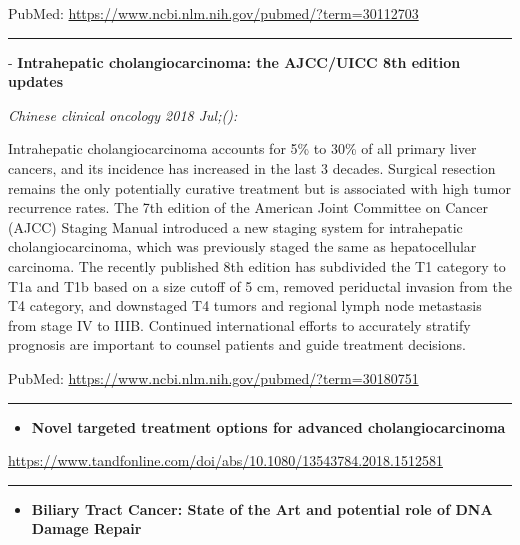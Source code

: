 \documentclass[]{article}
\providecommand{\tightlist}{%
  \setlength{\itemsep}{0pt}\setlength{\parskip}{0pt}}
\begin{document}
PubMed: \url{https://www.ncbi.nlm.nih.gov/pubmed/?term=30112703}

{}

{}

\begin{center}\rule{0.5\linewidth}{\linethickness}\end{center}

 - \textbf{Intrahepatic cholangiocarcinoma: the AJCC/UICC 8th edition
updates}

\emph{Chinese clinical oncology 2018 Jul;():}

Intrahepatic cholangiocarcinoma accounts for 5\% to 30\% of all primary
liver cancers, and its incidence has increased in the last 3 decades.
Surgical resection remains the only potentially curative treatment but
is associated with high tumor recurrence rates. The 7th edition of the
American Joint Committee on Cancer (AJCC) Staging Manual introduced a
new staging system for intrahepatic cholangiocarcinoma, which was
previously staged the same as hepatocellular carcinoma. The recently
published 8th edition has subdivided the T1 category to T1a and T1b
based on a size cutoff of 5 cm, removed periductal invasion from the T4
category, and downstaged T4 tumors and regional lymph node metastasis
from stage IV to IIIB. Continued international efforts to accurately
stratify prognosis are important to counsel patients and guide treatment
decisions.

PubMed: \url{https://www.ncbi.nlm.nih.gov/pubmed/?term=30180751}

{}

{}

\begin{center}\rule{0.5\linewidth}{\linethickness}\end{center}

\begin{itemize}
\tightlist
\item
  \textbf{Novel targeted treatment options for advanced
  cholangiocarcinoma}
\end{itemize}

\url{https://www.tandfonline.com/doi/abs/10.1080/13543784.2018.1512581}

\begin{center}\rule{0.5\linewidth}{\linethickness}\end{center}

\begin{itemize}
\tightlist
\item
  \textbf{Biliary Tract Cancer: State of the Art and potential role of
  DNA Damage Repair}
\end{itemize}
\end{document}

